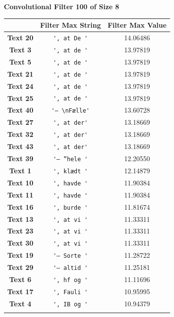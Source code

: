 \begin{table}
    \centering
    \textbf{Convolutional Filter 100 of Size 8}\par\medskip
    \begin{tabular}{c|cc}
        & \textbf{Filter Max String} & \textbf{Filter Max Value} \\ \hline
        \textbf{Text 20} & \verb{', at De '{ & 14.06486 \\
        \textbf{Text 3} & \verb{', at de '{ & 13.97819 \\
        \textbf{Text 5} & \verb{', at de '{ & 13.97819 \\
        \textbf{Text 21} & \verb{', at de '{ & 13.97819 \\
        \textbf{Text 24} & \verb{', at de '{ & 13.97819 \\
        \textbf{Text 25} & \verb{', at de '{ & 13.97819 \\
        \textbf{Text 40} & \verb{'– \nFælle'{ & 13.60728 \\
        \textbf{Text 27} & \verb{', at der'{ & 13.18669 \\
        \textbf{Text 32} & \verb{', at der'{ & 13.18669 \\
        \textbf{Text 43} & \verb{', at der'{ & 13.18669 \\
        \textbf{Text 39} & \verb{'– ”hele '{ & 12.20550 \\
        \textbf{Text 1} & \verb{', klædt '{ & 12.14879 \\
        \textbf{Text 10} & \verb{', havde '{ & 11.90384 \\
        \textbf{Text 11} & \verb{', havde '{ & 11.90384 \\
        \textbf{Text 16} & \verb{', burde '{ & 11.81674 \\
        \textbf{Text 13} & \verb{', at vi '{ & 11.33311 \\
        \textbf{Text 23} & \verb{', at vi '{ & 11.33311 \\
        \textbf{Text 30} & \verb{', at vi '{ & 11.33311 \\
        \textbf{Text 19} & \verb{'– Sorte '{ & 11.28722 \\
        \textbf{Text 29} & \verb{'– altid '{ & 11.25181 \\
        \textbf{Text 6} & \verb{', hf og '{ & 11.11696 \\
        \textbf{Text 17} & \verb{', Fauli '{ & 10.95995 \\
        \textbf{Text 4} & \verb{', IB og '{ & 10.94379 \\
}}}}}}}}}}}}}}}}}}}}}}}
\end{tabular}
\end{table}
